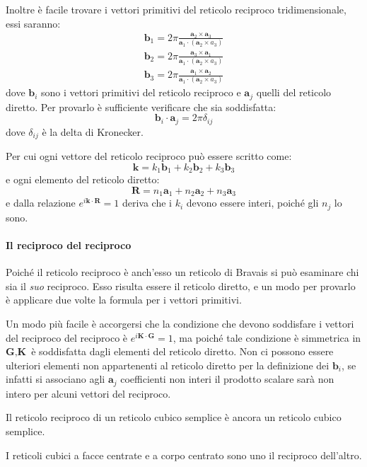 Inoltre è facile trovare i vettori primitivi del reticolo reciproco tridimensionale, essi saranno:
\begin{align*}
\textbf{b}_1 = 2\pi \frac{\textbf{a}_2 \times \textbf{a}_3}{\textbf{a}_1 \cdot (\textbf{a}_2 \times a_3)}\\
\textbf{b}_2 = 2\pi \frac{\textbf{a}_3 \times \textbf{a}_1}{\textbf{a}_1 \cdot (\textbf{a}_2 \times a_3)}\\
\textbf{b}_3 = 2\pi \frac{\textbf{a}_1 \times \textbf{a}_2}{\textbf{a}_1 \cdot (\textbf{a}_2 \times a_3)}
\end{align*}
dove $ \textbf{b}_i $ sono i vettori primitivi del reticolo reciproco e $ \textbf{a}_j $ quelli del reticolo diretto.
Per provarlo è sufficiente verificare che sia soddisfatta:
\[ \textbf{b}_i \cdot \textbf{a}_j = 2\pi \delta_{ij} \]
dove $ \delta_{ij} $ è la delta di Kronecker.

Per cui ogni vettore del reticolo reciproco può essere scritto come:
\[ \textbf{k} = k_1 \textbf{b}_1 + k_2 \textbf{b}_2 + k_3 \textbf{b}_3\]
e ogni elemento del reticolo diretto:
\[ \textbf{R} = n_1 \textbf{a}_1 + n_2 \textbf{a}_2 + n_3 \textbf{a}_3\]
e dalla relazione $ e^{i\textbf{k}\cdot\textbf{R}} = 1 $ deriva che i $ k_i $ devono essere interi, poiché gli $ n_j $ lo sono.

\paragraph{Il reciproco del reciproco} Poiché il reticolo reciproco è anch'esso un reticolo di Bravais si può esaminare chi sia il \textit{suo} reciproco.
Esso risulta essere il reticolo diretto, e un modo per provarlo è applicare due volte la formula per i vettori primitivi.

Un modo più facile è accorgersi che la condizione che devono soddisfare i vettori del reciproco del reciproco è $ e^{i\textbf{K}\cdot\textbf{G}} = 1$, ma poiché tale condizione è simmetrica in $ \textbf{G},\textbf{K} $ è soddisfatta dagli elementi del reticolo diretto. Non ci possono essere ulteriori elementi non appartenenti al reticolo diretto per la definizione dei $ \textbf{b}_i $, se infatti si associano agli $ \textbf{a}_j $ coefficienti non interi il prodotto scalare sarà non intero per alcuni vettori del reciproco.

\begin{es}
	Il reticolo reciproco di un reticolo cubico semplice è ancora un reticolo cubico semplice.
	
	I reticoli cubici a facce centrate e a corpo centrato sono uno il reciproco dell'altro.
\end{es}

